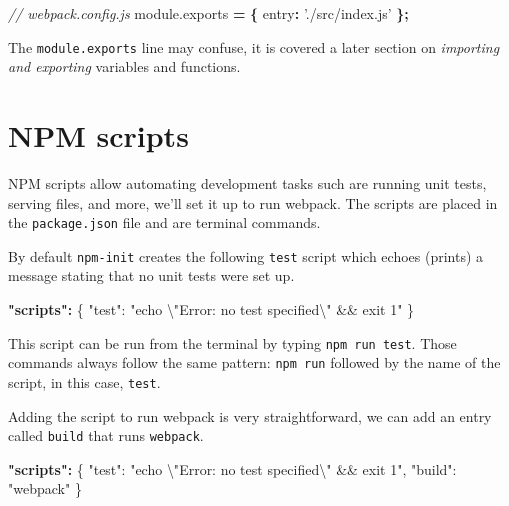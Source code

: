 \documentclass[10pt,]{krantz}
\makeatletter
\newenvironment{Shaded}{\begin{snugshade}}{\end{snugshade}}
\newcommand{\AttributeTok}[1]{\textcolor[rgb]{0.61,0.61,0.61}{#1}}
\newcommand{\CharTok}[1]{\textcolor[rgb]{0.5,0.5,0.5}{#1}}
\newcommand{\CommentTok}[1]{\textcolor[rgb]{0.37,0.37,0.37}{\textit{#1}}}
\newcommand{\DataTypeTok}[1]{\textcolor[rgb]{0.27,0.27,0.27}{#1}}
\newcommand{\ErrorTok}[1]{\textcolor[rgb]{0.14,0.14,0.14}{\textbf{#1}}}
\newcommand{\FunctionTok}[1]{\textcolor[rgb]{0,0,0}{#1}}
\newcommand{\NormalTok}[1]{#1}
\newcommand{\OperatorTok}[1]{\textcolor[rgb]{0.43,0.43,0.43}{\textbf{#1}}}
\newcommand{\StringTok}[1]{\textcolor[rgb]{0.5,0.5,0.5}{#1}}
\newcommand{\VariableTok}[1]{\textcolor[rgb]{0,0,0}{#1}}
\newenvironment{kframe}{%
\medskip{}
\setlength{\fboxsep}{.8em}
 \def\at@end@of@kframe{}%
 \ifinner\ifhmode%
  \def\at@end@of@kframe{\end{minipage}}%
  \begin{minipage}{\columnwidth}%
 \fi\fi%
 \def\FrameCommand##1{\hskip\@totalleftmargin \hskip-\fboxsep
 \colorbox{shadecolor}{##1}\hskip-\fboxsep
     \hskip-\linewidth \hskip-\@totalleftmargin \hskip\columnwidth}%
 \MakeFramed {\advance\hsize-\width
   \@totalleftmargin\z@ \linewidth\hsize
   \@setminipage}}%
 {\par\unskip\endMakeFramed%
 \at@end@of@kframe}
\renewenvironment{Shaded}{\begin{kframe}}{\end{kframe}}
\makeatother
\begin{document}
\begin{Shaded}
\begin{Highlighting}[]
\CommentTok{// webpack.config.js}
\VariableTok{module}\NormalTok{.}\AttributeTok{exports} \OperatorTok{=} \OperatorTok{\{}
  \DataTypeTok{entry}\OperatorTok{:} \StringTok{'./src/index.js'}
\OperatorTok{\};}
\end{Highlighting}
\end{Shaded}

The \texttt{module.exports} line may confuse, it is covered a later section on \emph{importing and exporting} variables and functions.

\hypertarget{webpack-intro-npm-scripts}{%
\section{NPM scripts}\label{webpack-intro-npm-scripts}}

NPM scripts allow automating development tasks such are running unit tests, serving files, and more, we'll set it up to run webpack. The scripts are placed in the \texttt{package.json} file and are terminal commands.

By default \texttt{npm-init} creates the following \texttt{test} script which echoes (prints) a message stating that no unit tests were set up.

\begin{Shaded}
\begin{Highlighting}[]
\ErrorTok{"scripts":} \FunctionTok{\{}
  \DataTypeTok{"test"}\FunctionTok{:} \StringTok{"echo }\CharTok{\textbackslash{}"}\StringTok{Error: no test specified}\CharTok{\textbackslash{}"}\StringTok{ && exit 1"}
\FunctionTok{\}}
\end{Highlighting}
\end{Shaded}

This script can be run from the terminal by typing \texttt{npm\ run\ test}. Those commands always follow the same pattern: \texttt{npm\ run} followed by the name of the script, in this case, \texttt{test}.

Adding the script to run webpack is very straightforward, we can add an entry called \texttt{build} that runs \texttt{webpack}.

\begin{Shaded}
\begin{Highlighting}[]
\ErrorTok{"scripts":} \FunctionTok{\{}
  \DataTypeTok{"test"}\FunctionTok{:} \StringTok{"echo }\CharTok{\textbackslash{}"}\StringTok{Error: no test specified}\CharTok{\textbackslash{}"}\StringTok{ && exit 1"}\FunctionTok{,}
  \DataTypeTok{"build"}\FunctionTok{:} \StringTok{"webpack"}
\FunctionTok{\}}
\end{Highlighting}
\end{Shaded}
\end{document}

